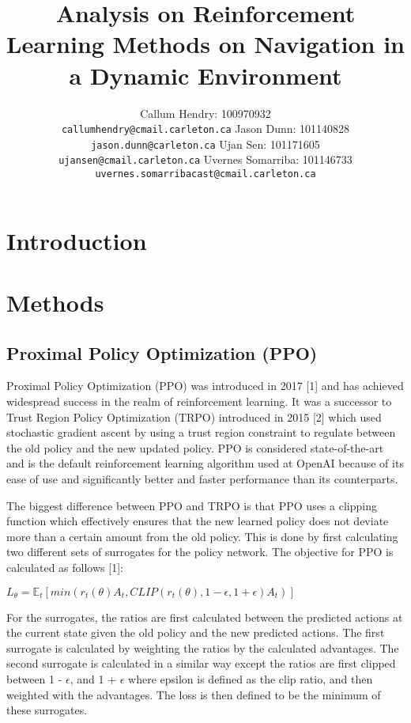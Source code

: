 \documentclass{article}
\title{Analysis on Reinforcement Learning Methods on Navigation in a Dynamic Environment}
\author{
Callum Hendry: 100970932\\
\texttt{callumhendry@cmail.carleton.ca}
\And
Jason Dunn: 101140828\\
\texttt{jason.dunn@carleton.ca}
\And
Ujan Sen: 101171605\\
\texttt{ujansen@cmail.carleton.ca}
\And
Uvernes Somarriba: 101146733\\
\texttt{uvernes.somarribacast@cmail.carleton.ca}
}
\begin{document}
\maketitle

\section{Introduction}

\section{Methods}
\subsection{Proximal Policy Optimization (PPO)}
\label{ppo}

Proximal Policy Optimization (PPO) was introduced in 2017 [1] and has achieved widespread success in the realm of reinforcement learning. It was a successor to Trust Region Policy Optimization (TRPO) introduced in 2015 [2] which used stochastic gradient ascent by using a trust region constraint to regulate between the old policy and the new updated policy. PPO is considered state-of-the-art and is the default reinforcement learning algorithm used at OpenAI because of its ease of use and significantly better and faster performance than its counterparts. 

The biggest difference between PPO and TRPO is that PPO uses a clipping function which effectively ensures that the new learned policy does not deviate more than a certain amount from the old policy. This is done by first calculating two different sets of surrogates for the policy network. The objective for PPO is calculated as follows [1]:

\begin{center}
$L_{\theta} = \mathbb{E}_{t}[min(r_{t}({\theta})A_{t}, CLIP(r_{t}({\theta}), 1-\epsilon, 1+\epsilon)A_{t})]$
\end{center}

For the surrogates, the ratios are first calculated between the predicted actions at the current state given the old policy and the new predicted actions. The first surrogate is calculated by weighting the ratios by the calculated advantages. The second surrogate is calculated in a similar way except the ratios are first clipped between 1 - $\epsilon$, and 1 + $\epsilon$ where epsilon is defined as the clip ratio, and then weighted with the advantages. The loss is then defined to be the minimum of these surrogates.
\end{document}
